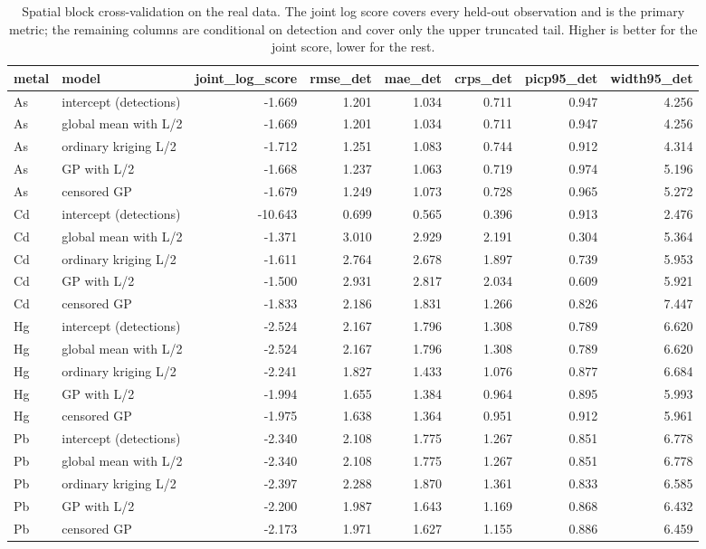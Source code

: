 \begin{table}[htbp]
\centering
\caption{Spatial block cross-validation on the real data. The joint log score covers every held-out observation and is the primary metric; the remaining columns are conditional on detection and cover only the upper truncated tail. Higher is better for the joint score, lower for the rest.}
\label{tab:cv}
\footnotesize
\begin{tabular}{llrrrrrr}
\toprule
metal & model & joint\_log\_score & rmse\_det & mae\_det & crps\_det & picp95\_det & width95\_det \\
\midrule
As & intercept (detections) & -1.669 & 1.201 & 1.034 & 0.711 & 0.947 & 4.256 \\
As & global mean with L/2 & -1.669 & 1.201 & 1.034 & 0.711 & 0.947 & 4.256 \\
As & ordinary kriging L/2 & -1.712 & 1.251 & 1.083 & 0.744 & 0.912 & 4.314 \\
As & GP with L/2 & -1.668 & 1.237 & 1.063 & 0.719 & 0.974 & 5.196 \\
As & censored GP & -1.679 & 1.249 & 1.073 & 0.728 & 0.965 & 5.272 \\
Cd & intercept (detections) & -10.643 & 0.699 & 0.565 & 0.396 & 0.913 & 2.476 \\
Cd & global mean with L/2 & -1.371 & 3.010 & 2.929 & 2.191 & 0.304 & 5.364 \\
Cd & ordinary kriging L/2 & -1.611 & 2.764 & 2.678 & 1.897 & 0.739 & 5.953 \\
Cd & GP with L/2 & -1.500 & 2.931 & 2.817 & 2.034 & 0.609 & 5.921 \\
Cd & censored GP & -1.833 & 2.186 & 1.831 & 1.266 & 0.826 & 7.447 \\
Hg & intercept (detections) & -2.524 & 2.167 & 1.796 & 1.308 & 0.789 & 6.620 \\
Hg & global mean with L/2 & -2.524 & 2.167 & 1.796 & 1.308 & 0.789 & 6.620 \\
Hg & ordinary kriging L/2 & -2.241 & 1.827 & 1.433 & 1.076 & 0.877 & 6.684 \\
Hg & GP with L/2 & -1.994 & 1.655 & 1.384 & 0.964 & 0.895 & 5.993 \\
Hg & censored GP & -1.975 & 1.638 & 1.364 & 0.951 & 0.912 & 5.961 \\
Pb & intercept (detections) & -2.340 & 2.108 & 1.775 & 1.267 & 0.851 & 6.778 \\
Pb & global mean with L/2 & -2.340 & 2.108 & 1.775 & 1.267 & 0.851 & 6.778 \\
Pb & ordinary kriging L/2 & -2.397 & 2.288 & 1.870 & 1.361 & 0.833 & 6.585 \\
Pb & GP with L/2 & -2.200 & 1.987 & 1.643 & 1.169 & 0.868 & 6.432 \\
Pb & censored GP & -2.173 & 1.971 & 1.627 & 1.155 & 0.886 & 6.459 \\
\bottomrule
\end{tabular}
\end{table}
